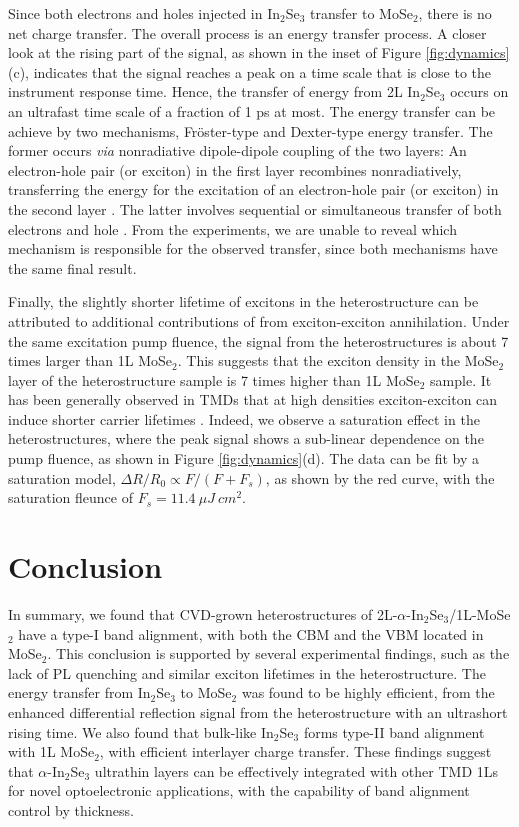 \documentclass[journal=jacsat,manuscript=article]{achemso}
\begin{document}
Since both electrons and holes injected in In$_2$Se$_3$ transfer to MoSe$_2$, there is no net charge transfer. The overall process is an energy transfer process. A closer look at the rising part of the signal, as shown in the inset of Figure \ref{fig:dynamics}(c), indicates that the signal reaches a peak on a time scale that is close to the instrument response time. Hence, the transfer of energy from 2L In$_2$Se$_3$ occurs on an ultrafast time scale of a fraction of 1 ps at most. The energy transfer can be achieve by two mechanisms, Fr{\"o}ster-type and Dexter-type energy transfer. The former occurs {\it via} nonradiative dipole-dipole coupling of the two layers: An electron-hole pair (or exciton) in the first layer recombines nonradiatively, transferring the energy for the excitation of an electron-hole pair (or exciton) in the second layer \cite{cr1051491}. The latter involves sequential or simultaneous transfer of both electrons and hole  \cite{jcp21836,jpcb1081537}. From the experiments, we are unable to reveal which mechanism is responsible for the observed transfer, since both mechanisms have the same final result.

Finally, the slightly shorter lifetime of excitons in the heterostructure can be attributed to additional contributions of from exciton-exciton annihilation. Under the same excitation pump fluence, the signal from the heterostructures is about 7 times larger than 1L MoSe$_2$. This suggests that the exciton density in the MoSe$_2$ layer of the heterostructure sample is 7 times higher than 1L MoSe$_2$ sample. It has been generally observed in TMDs that at high densities exciton-exciton can induce shorter carrier lifetimes \cite{b89125427,nl145625,nanoscale77402,nm14889}. Indeed, we observe a saturation effect in the heterostructures, where the peak signal shows a sub-linear dependence on the pump fluence, as shown in Figure \ref{fig:dynamics}(d). The data can be fit by a saturation model, $\Delta R / R_0 \propto F / (F + F_s)$, as shown by the red curve, with the saturation fleunce of $F_s = 11.4~ \mu J~cm^{2}$.

\section{Conclusion}

In summary, we found that CVD-grown heterostructures of 2L-$\alpha$-In$_2$Se$_3$/1L-MoSe$_2$ have a type-I band alignment, with both the CBM and the VBM located in MoSe$_2$. This conclusion is supported by several experimental findings, such as the lack of PL quenching and similar exciton lifetimes in the heterostructure. The energy transfer from In$_2$Se$_3$ to MoSe$_2$ was found to be highly efficient, from the enhanced differential reflection signal from the heterostructure with an ultrashort rising time. We also found that bulk-like In$_2$Se$_3$ forms type-II band alignment with 1L MoSe$_2$, with efficient interlayer charge transfer. These findings suggest that $\alpha$-In$_2$Se$_3$ ultrathin layers can be effectively integrated with other TMD 1Ls for novel optoelectronic applications, with the capability of band alignment control by thickness.
\end{document}
